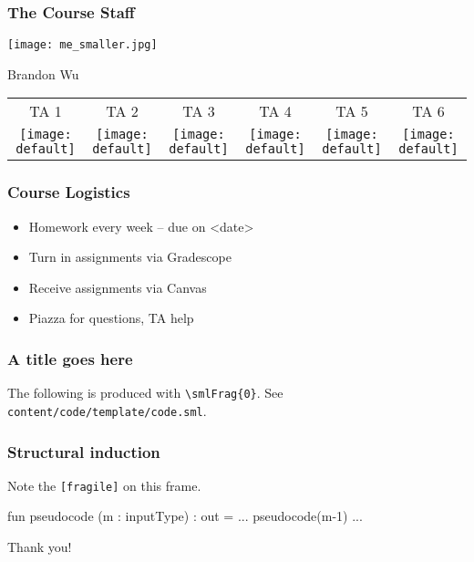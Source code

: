 \documentclass[aspectratio=169]{beamer}
\begin{document}
\begin{frame}[fragile]
    \frametitle{The Course Staff}

    \begin{center} \texttt{[image: me\_smaller.jpg]} \end{center}
    \begin{center} \Large Brandon Wu \end{center}
    
    \vspace{\fill}

    \begin{center}\begin{tabular}{c c c c c c}
      TA 1 & TA 2 & TA 3 & TA 4 & TA 5 & TA 6 \\  
      \texttt{[image: default]} &
      \texttt{[image: default]} &
      \texttt{[image: default]} &
      \texttt{[image: default]} &
      \texttt{[image: default]} &
      \texttt{[image: default]} \\
    \end{tabular}\end{center}

\end{frame}


\begin{frame}[fragile]
    \frametitle{Course Logistics}

    \begin{itemize}
      \item Homework every week -- due on <date>
      \item Turn in assignments via Gradescope
      \item Receive assignments via Canvas
      \item Piazza for questions, TA help
    \end{itemize}

\end{frame}
 

\begin{frame}
    \frametitle{A title goes here}
    The following is produced with \texttt{\textbackslash smlFrag\{0\}}. See \texttt{content/code/template/code.sml}. \pause

\end{frame}

\begin{frame}[fragile]
    \frametitle{Structural induction}
    Note the \texttt{[fragile]} on this frame.\pause

    \begin{codeblock}
       fun pseudocode (m : inputType) : out = 
                 ... 
             pseudocode(m-1) 
                 ... 
    \end{codeblock}
\end{frame}

\begin{frame}[plain]
	\begin{center} Thank you! \end{center}
\end{frame}
\end{document}

